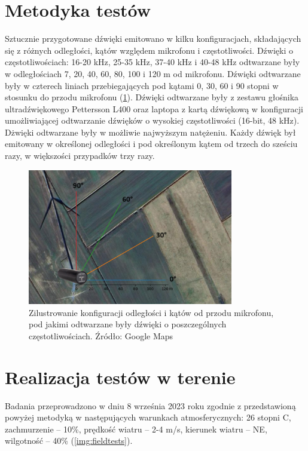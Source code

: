 \documentclass{sprz}
\begin{document}
\section{Metodyka testów}
Sztucznie przygotowane dźwięki emitowano w kilku konfiguracjach, składających się z różnych odległości, kątów względem mikrofonu i częstotliwości. Dźwięki o częstotliwościach: 16-20 kHz, 25-35 kHz, 37-40 kHz i 40-48 kHz odtwarzane były w odległościach 7, 20, 40, 60, 80, 100 i 120 m od mikrofonu. Dźwięki odtwarzane były w czterech liniach przebiegających pod kątami 0, 30, 60 i 90 stopni w stosunku do przodu mikrofonu (\ref{img:angles}). Dźwięki odtwarzane były z zestawu głośnika ultradźwiękowego Pettersson L400 oraz laptopa z kartą dźwiękową w konfiguracji umożliwiającej odtwarzanie dźwięków o wysokiej częstotliwości (16-bit, 48 kHz). Dżwięki odtwarzane były w możliwie najwyższym natężeniu. Każdy dźwięk był emitowany w określonej odległości i pod określonym kątem od trzech do sześciu razy, w większości przypadków trzy razy.

\begin{figure}[h]
  \centering
  \includegraphics[width=0.8\textwidth]{sprz/angles.png}
  \caption{Zilustrowanie konfiguracji odległości i kątów od przodu mikrofonu, pod jakimi odtwarzane były dźwięki o poszczególnych częstotliwościach. Źródło: Google Maps}
  \label{img:angles}
\end{figure} 

\section{Realizacja testów w terenie}
Badania przeprowadzono w dniu 8 września 2023 roku zgodnie z przedstawioną powyżej metodyką w następujących warunkach atmosferycznych: 26 stopni C, zachmurzenie – 10\%, prędkość wiatru – 2-4 m/s, kierunek wiatru – NE, wilgotność – 40\% (\ref{img:fieldtests}).
\end{document}
